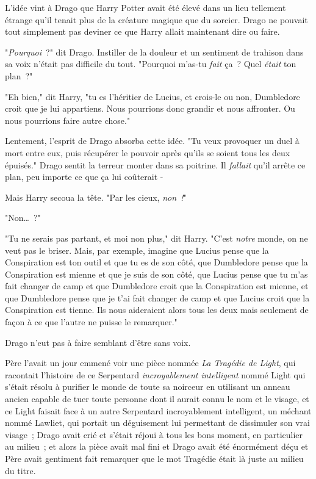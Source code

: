 L'idée vint à Drago que Harry Potter avait été élevé dans un lieu tellement étrange qu'il tenait plus de la créature magique que du sorcier. Drago ne pouvait tout simplement pas deviner ce que Harry allait maintenant dire ou faire.

"\emph{Pourquoi}~?" dit Drago. Instiller de la douleur et un sentiment de trahison dans sa voix n'était pas difficile du tout. "Pourquoi m'as-tu \emph{fait} ça~? Quel \emph{était} ton plan~?"

"Eh bien," dit Harry, "tu es l'héritier de Lucius, et crois-le ou non, Dumbledore croit que je lui appartiens. Nous pourrions donc grandir et nous affronter. Ou nous pourrions faire autre chose."

Lentement, l'esprit de Drago absorba cette idée. "Tu veux provoquer un duel à mort entre eux, puis récupérer le pouvoir après qu'ils se soient tous les deux épuisés." Drago sentit la terreur monter dans sa poitrine. Il \emph{fallait} qu'il arrête ce plan, peu importe ce que ça lui coûterait -

Mais Harry secoua la tête. "Par les cieux, \emph{non~!}"

"Non…~?"

"Tu ne serais pas partant, et moi non plus," dit Harry. "C'est \emph{notre} monde, on ne veut pas le briser. Mais, par exemple, imagine que Lucius pense que la Conspiration est ton outil et que tu es de son côté, que Dumbledore pense que la Conspiration est mienne et que je suis de son côté, que Lucius pense que tu m'as fait changer de camp et que Dumbledore croit que la Conspiration est mienne, et que Dumbledore pense que je t'ai fait changer de camp et que Lucius croit que la Conspiration est tienne. Ils nous aideraient alors tous les deux mais seulement de façon à ce que l'autre ne puisse le remarquer."

Drago n'eut pas à faire semblant d'être sans voix.

Père l'avait un jour emmené voir une pièce nommée \emph{La Tragédie de Light}, qui racontait l'histoire de ce Serpentard \emph{incroyablement intelligent} nommé Light qui s'était résolu à purifier le monde de toute sa noirceur en utilisant un anneau ancien capable de tuer toute personne dont il aurait connu le nom et le visage, et ce Light faisait face à un autre Serpentard incroyablement intelligent, un méchant nommé Lawliet, qui portait un déguisement lui permettant de dissimuler son vrai visage~; Drago avait crié et s'était réjoui à tous les bons moment, en particulier au milieu~; et alors la pièce avait mal fini et Drago avait été énormément déçu et Père avait gentiment fait remarquer que le mot Tragédie était là juste au milieu du titre.

